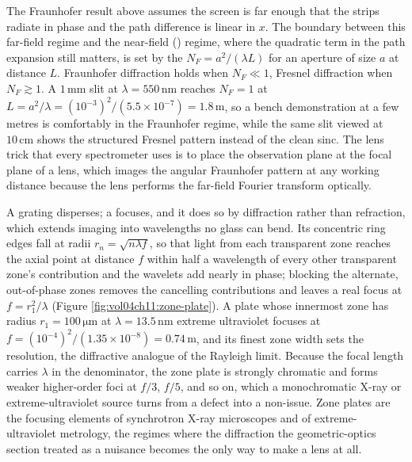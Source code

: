 

The Fraunhofer result above assumes the screen is far enough that the
strips radiate in phase and the path difference is linear in $x$. The
boundary between this far-field regime and the near-field
() regime, where the quadratic term in the path
expansion still matters, is set by the 
$N_{F} = a^{2}/(\lambda L)$ for an aperture of size $a$ at distance $L$.
Fraunhofer diffraction holds when $N_{F} \ll 1$, Fresnel diffraction
when $N_{F} \gtrsim 1$. A $1\,\si{\milli\meter}$ slit at
$\lambda = 550\,\si{\nano\meter}$ reaches $N_{F} = 1$ at
$L = a^{2}/\lambda = (10^{-3})^{2}/(5.5\times10^{-7}) = 1.8\,\si{\meter}$,
so a bench demonstration at a few metres is comfortably in the
Fraunhofer regime, while the same slit viewed at $10\,\si{\centi\meter}$
shows the structured Fresnel pattern instead of the clean sinc. The
lens trick that every spectrometer uses is to place the observation
plane at the focal plane of a lens, which images the angular
Fraunhofer pattern at any working distance because the lens performs the
far-field Fourier transform optically.



A grating disperses; a  focuses, and it does so by
diffraction rather than refraction, which extends imaging into wavelengths no glass
can bend. Its concentric ring edges fall at radii $r_n = \sqrt{n\lambda f}$, so
that light from each transparent zone reaches the axial point at distance $f$
within half a wavelength of every other transparent zone's contribution and the
wavelets add nearly in phase; blocking the alternate, out-of-phase zones removes
the cancelling contributions and leaves a real focus at $f = r_1^2/\lambda$ (Figure
\ref{fig:vol04ch11:zone-plate}). A plate whose innermost zone has radius
$r_1 = 100\,\si{\micro\meter}$ at $\lambda = 13.5\,\si{\nano\meter}$ extreme
ultraviolet focuses at $f = (10^{-4})^2/(1.35\times 10^{-8}) = 0.74\,\si{\meter}$,
and its finest zone width sets the resolution, the diffractive analogue of the
Rayleigh limit. Because the focal length carries $\lambda$ in the denominator, the
zone plate is strongly chromatic and forms weaker higher-order foci at $f/3$,
$f/5$, and so on, which a monochromatic X-ray or extreme-ultraviolet source turns
from a defect into a non-issue. Zone plates are the focusing elements of
synchrotron X-ray microscopes and of extreme-ultraviolet metrology, the regimes
where the diffraction the geometric-optics section treated as a nuisance becomes
the only way to make a lens at all.

